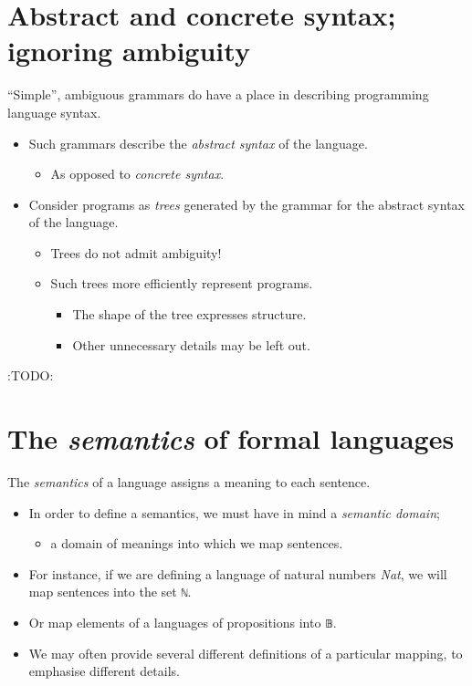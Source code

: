 \documentclass[11pt]{article}
\theoremstyle{definition}
\begin{document}
\section{Abstract and concrete syntax; ignoring ambiguity}
\label{sec:org3538c4b}
“Simple”, ambiguous grammars do have a place in describing
programming language syntax.
\begin{itemize}
\item Such grammars describe the \emph{abstract syntax} of the language.
\begin{itemize}
\item As opposed to \emph{concrete syntax}.
\end{itemize}
\item Consider programs as \emph{trees} generated by the grammar
for the abstract syntax of the language.
\begin{itemize}
\item Trees do not admit ambiguity!
\item Such trees more efficiently represent programs.
\begin{itemize}
\item The shape of the tree expresses structure.
\item Other unnecessary details may be left out.
\end{itemize}
\end{itemize}
\end{itemize}

:TODO:

\section{The \emph{semantics} of formal languages}
\label{sec:org2f31e71}
The \emph{semantics} of a language assigns a meaning to each sentence.
\begin{itemize}
\item In order to define a semantics, we must
have in mind a \emph{semantic domain};
\begin{itemize}
\item a domain of meanings into which we map sentences.
\end{itemize}
\item For instance, if we are defining a language
of natural numbers \emph{Nat}, we will map sentences into the set \texttt{ℕ}.
\item Or map elements of a languages of propositions into \texttt{𝔹}.
\item We may often provide several different definitions of
a particular mapping, to emphasise different details.
\end{itemize}
\end{document}
